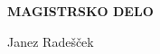 \documentclass[12pt,a4paper]{article}
\begin{document}
\thispagestyle{empty}	
	\phantom{FMF}

		\vfill	
	\begin{center}
		\Large
		\textbf{\MakeUppercase{MAGISTRSKO DELO}}\\[10mm]
	\end{center}
		\vfill

	\begin{flushright}
		\large
		Janez Radešček
	\end{flushright}
		
\end{document}
